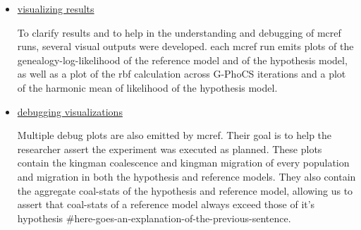 \documentclass[11pt]{article}
\newcommand{\1}{\mathbbm{1}}
\newcommand{\gp}{G-PhoCS }
\begin{document}
\begin{itemize}
\item \underline{visualizing results}

To clarify results and to help in the understanding and debugging of mcref runs, several visual outputs were developed. each mcref run emits plots of the genealogy-log-likelihood of the reference model and of the hypothesis model, as well as a plot of the rbf calculation across \gp iterations and a plot of the harmonic mean of likelihood of the hypothesis model.

\item \underline{debugging visualizations}

Multiple debug plots are also emitted by mcref. Their goal is to help the researcher assert the experiment was executed as planned. These plots contain the kingman coalescence and kingman migration of every population and migration in both the hypothesis and reference models. They also contain the aggregate coal-stats of the hypothesis and reference model, allowing us to assert that coal-stats of a reference model always exceed those of it's hypothesis \#here-goes-an-explanation-of-the-previous-sentence. 
\end{itemize}
\end{document}
